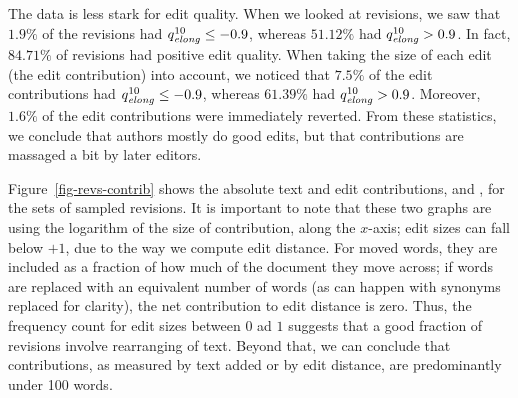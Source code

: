 The data is less stark for edit quality.
When we looked at revisions, we saw that $1.9\%$ of the revisions
had $\quality{elong}{10}{} \le -0.9$, whereas $51.12\%$ had
$\quality{elong}{10}{} > 0.9$.
In fact, $84.71\%$ of revisions had positive edit quality.
When taking the size of each edit (the edit contribution) into
account, we noticed that $7.5\%$ of the
edit contributions had $\quality{elong}{10}{} \le -0.9$, whereas
$61.39\%$ had $\quality{elong}{10}{} > 0.9$.
Moreover, $1.6\%$ of the edit contributions were immediately
reverted.
From these statistics, we conclude that authors mostly do good
edits, but that contributions are massaged a bit by later editors.

Figure~\ref{fig-revs-contrib} shows the absolute text and edit
contributions,  and , for the sets of sampled revisions.
It is important to note that these two graphs are using
the logarithm of the size of contribution, along the $x$-axis;
edit sizes can fall below $+1$, due to the way we compute
edit distance.
For moved words, they are included as a fraction of how much of
the document they move across;
if words are replaced with an equivalent number of words (as
can happen with synonyms replaced for clarity), the net contribution
to edit distance is zero.
Thus, the frequency count for edit sizes between $0$ ad $1$
suggests that a good fraction of revisions involve rearranging
of text.
Beyond that, we can conclude that contributions, as measured
by text added or by edit distance, are predominantly under
100 words.
%
